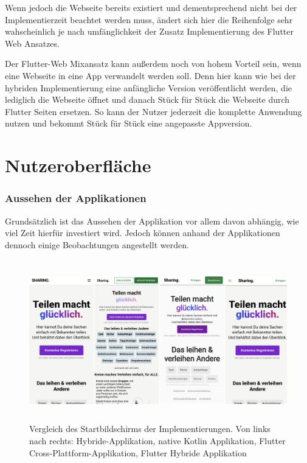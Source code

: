Wenn jedoch die Webseite bereits existiert und dementsprechend nicht bei der Implementierzeit beachtet werden muss, ändert sich hier die Reihenfolge sehr wahscheinlich je nach umfänglichkeit der Zusatz Implementierung des Flutter Web Ansatzes.

Der Flutter-Web Mixansatz kann außerdem noch von hohem Vorteil sein, wenn eine Webseite in eine App verwandelt werden soll. Denn hier kann wie bei der hybriden Implementierung eine anfängliche Version veröffentlicht werden, die lediglich die Webseite öffnet und danach Stück für Stück die Webseite durch Flutter Seiten ersetzen. So kann der Nutzer jederzeit die komplette Anwendung nutzen und bekommt Stück für Stück eine angepasste Appversion.

\section{Nutzeroberfläche}
\subsubsection{Aussehen der Applikationen}
Grundsätzlich ist das Aussehen der Applikation vor allem davon abhängig, wie viel Zeit hierfür investiert wird. Jedoch können anhand der Applikationen dennoch einige Beobachtungen angestellt werden.

\begin{figure}[ht]
  \centering
  \includegraphics[height=7cm,keepaspectratio]{images/Startbildschirm_vergleich.png} 
  \caption[Vergleich des Startbildschirms der Implementierungen]{Vergleich des Startbildschirms der Implementierungen. Von links nach rechts: Hybride-Applikation, native Kotlin Applikation, Flutter Cross-Plattform-Applikation, Flutter Hybride Applikation}
  \label{fig:startscreen}
\end{figure}


